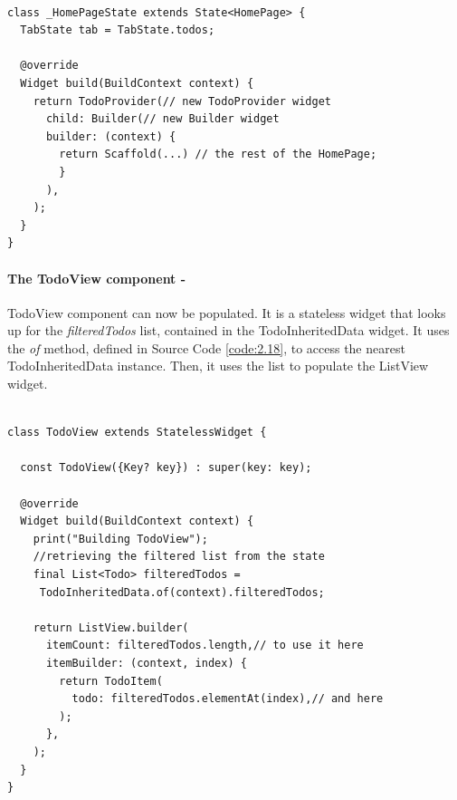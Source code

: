 \mbox{}\\
\begin{code}

 \mbox{}

\label{code:2.21}
\begin{verbatim}
class _HomePageState extends State<HomePage> {
  TabState tab = TabState.todos;

  @override
  Widget build(BuildContext context) {
    return TodoProvider(// new TodoProvider widget
      child: Builder(// new Builder widget
      builder: (context) {
        return Scaffold(...) // the rest of the HomePage;      
        }
      ),
    );
  }
}
\end{verbatim}
\end{code}
\paragraph{The TodoView component - }
\label{subpar:todo_app_inherited_widget_todoview_component}
TodoView component can now be populated. It is a stateless widget that looks up for the \textit{filteredTodos} list, contained in the TodoInheritedData widget. It uses the \textit{of} method, defined in Source Code \ref{code:2.18}, to access the nearest TodoInheritedData instance. Then, it uses the list to populate the ListView widget. 
\mbox{}\\

\begin{code}
 \mbox{}

\label{code:2.22}
\begin{verbatim}

class TodoView extends StatelessWidget {

  const TodoView({Key? key}) : super(key: key);

  @override
  Widget build(BuildContext context) {
    print("Building TodoView");
    //retrieving the filtered list from the state
    final List<Todo> filteredTodos =
     TodoInheritedData.of(context).filteredTodos;

    return ListView.builder(
      itemCount: filteredTodos.length,// to use it here
      itemBuilder: (context, index) {
        return TodoItem(
          todo: filteredTodos.elementAt(index),// and here
        );
      },
    );
  }
}
\end{verbatim}
\end{code}

